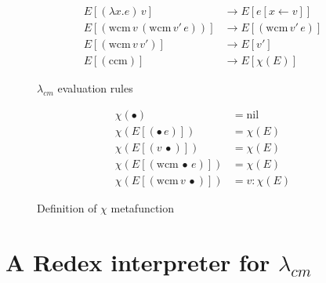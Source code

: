 \documentclass[ms,electronic,twosidetoc,letterpaper,chaptercenter,parttop]{byumsphd}
\begin{document}
\begin{figure}
\begin{align*}
E[(\lambda x.e)\,v]                         &\rightarrow E[e[x\leftarrow v]]\\
E[(\mathrm{wcm}\,v\,(\mathrm{wcm}\,v'\,e))] &\rightarrow E[(\mathrm{wcm}\,v'\,e)]\\
E[(\mathrm{wcm}\,v\,v')]                    &\rightarrow E[v']\\
E[(\mathrm{ccm})]                           &\rightarrow E[\chi(E)]
\end{align*}
\caption{$\lambda_{cm}$ evaluation rules}
\label{language-semantics}
\end{figure}

\begin{figure}
\begin{align*}
\chi(\bullet)                       &= \mathrm{nil}\\
\chi(E[(\bullet\,e)])               &= \chi(E)\\
\chi(E[(v\,\bullet)])               &= \chi(E)\\
\chi(E[(\mathrm{wcm}\,\bullet\,e)]) &= \chi(E)\\
\chi(E[(\mathrm{wcm}\,v\,\bullet)]) &= v : \chi(E)
\end{align*}
\caption{Definition of $\chi$ metafunction}
\label{chi-metafunction}
\end{figure}

\section{A Redex interpreter for $\lambda_{cm}$}
\end{document}
